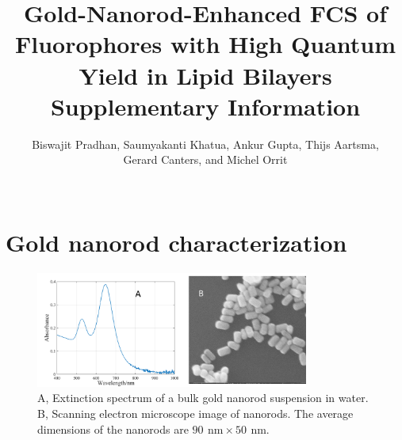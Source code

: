 \documentclass[11pt,a4paper,onecolumn]{article}
\newcommand{\nm}{\ensuremath{\,\textrm{nm}}}
\begin{document}
\author{
Biswajit Pradhan, Saumyakanti Khatua, Ankur Gupta,
Thijs Aartsma,\\ Gerard Canters, and Michel Orrit\\\\
}
\date{\vspace{1ex}} %

\title{\textbf{Gold-Nanorod-Enhanced FCS of Fluorophores with High Quantum Yield in Lipid Bilayers}\\ \vspace{3ex} Supplementary Information \vspace{3ex}}

\maketitle
\tableofcontents
\pagebreak

\section{Gold nanorod characterization}
\begin{figure}[ht]
  \centering
  \includegraphics[width=0.8\textwidth]{AuNR_uv-vis_SEM.png}
  \makeatletter
  \renewcommand{\fnum@figure}{\figurename~S\thefigure}
  \makeatother
  \caption{A, Extinction spectrum of a bulk gold nanorod suspension in water. B, Scanning electron microscope image of nanorods. The average dimensions of the nanorods are $90~\nm\times50~\nm$.}
  \label{SIfig: AuNR_uv-vis}
\end{figure}
\end{document}
